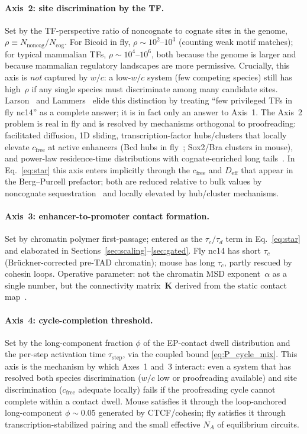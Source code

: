 \documentclass[11pt]{article}
\begin{document}
\paragraph{Axis~2: site discrimination by the TF.} Set by the TF-perspective
ratio of noncognate to cognate sites in the genome,
$\rho \equiv N_{\mathrm{noncog}}/N_{\mathrm{cog}}$. For Bicoid in fly,
$\rho\sim 10^{2}$--$10^{3}$ (counting weak motif matches); for typical
mammalian TFs, $\rho\sim 10^{4}$--$10^{6}$, both because the genome is
larger and because mammalian regulatory landscapes are more permissive.
Crucially, this axis is \emph{not} captured by $w/c$: a low-$w/c$ system
(few competing species) still has high~$\rho$ if any single species must
discriminate among many candidate sites. Larson~\cite{KimLarson2025}
and Lammers~\cite{Lammers2023} elide this distinction by treating
``few privileged TFs in fly nc14'' as a complete answer; it is in fact
only an answer to Axis~1. The Axis~2 problem is real in fly and is
resolved by mechanisms orthogonal to proofreading: facilitated diffusion,
1D sliding, transcription-factor hubs/clusters that locally elevate
$c_{\mathrm{free}}$ at active enhancers (Bcd hubs in
fly~\cite{Mir2017,Mir2018}; Sox2/Bra clusters in mouse), and power-law
residence-time distributions with cognate-enriched long
tails~\cite{Garcia2021NAR}. In Eq.~\eqref{eq:star} this axis enters
implicitly through the $c_{\mathrm{free}}$ and $D_{\mathrm{eff}}$ that
appear in the Berg--Purcell prefactor; both are reduced relative to bulk
values by noncognate sequestration~\cite{Mirny2009} and locally elevated
by hub/cluster mechanisms.

\paragraph{Axis~3: enhancer-to-promoter contact formation.} Set by
chromatin polymer first-passage; entered as the $\tau_c/\tau_d$ term in
Eq.~\eqref{eq:star} and elaborated in Sections~\ref{sec:scaling}--\ref{sec:gated}.
Fly nc14 has short $\tau_c$ (Br\"uckner-corrected pre-TAD chromatin);
mouse has long $\tau_c$, partly rescued by cohesin loops. Operative
parameter: not the chromatin MSD exponent~$\alpha$ as a single number,
but the connectivity matrix~$\mathbf{K}$ derived from the static contact
map~\cite{Shi2025}.

\paragraph{Axis~4: cycle-completion threshold.} Set by the long-component
fraction $\phi$ of the EP-contact dwell distribution and the per-step
activation time $\tau_{\mathrm{step}}$, via the coupled bound
\eqref{eq:P_cycle_mix}. This axis is the mechanism by which Axes~1 and~3
interact: even a system that has resolved both species discrimination
($w/c$ low or proofreading available) and site discrimination
($c_{\mathrm{free}}$ adequate locally) fails if the proofreading cycle
cannot complete within a contact dwell. Mouse satisfies it through the
loop-anchored long-component $\phi\sim 0.05$ generated by CTCF/cohesin;
fly satisfies it through transcription-stabilized pairing
\cite{Chen2018} and the small effective $N_A$ of equilibrium circuits.
\end{document}
